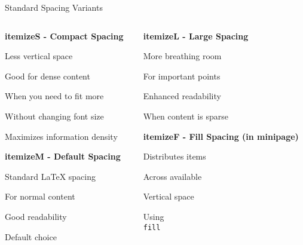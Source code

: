\documentclass[11pt,compress,t,notes=noshow, xcolor=table]{beamer}
\begin{document}
\begin{frame}{Standard Spacing Variants}
  \begin{columns}[T]
    \begin{column}{0.48\textwidth}
      \textbf{itemizeS - Compact Spacing}
      \begin{itemizeS}
        \item Less vertical space
        \item Good for dense content
        \item When you need to fit more
        \item Without changing font size
        \item Maximizes information density
      \end{itemizeS}
      
      \vspace{0.5cm}
      \textbf{itemizeM - Default Spacing}
      \begin{itemizeM}
        \item Standard LaTeX spacing
        \item For normal content
        \item Good readability
        \item Default choice
      \end{itemizeM}
    \end{column}
    
    \begin{column}{0.48\textwidth}
      \textbf{itemizeL - Large Spacing}
      \begin{itemizeL}
        \item More breathing room
        \item For important points
        \item Enhanced readability
        \item When content is sparse
      \end{itemizeL}
      
      \vspace{0.5cm}
      \textbf{itemizeF - Fill Spacing (in minipage)}
      \begin{minipage}[t]{\textwidth}
        \begin{itemizeF}
          \item Distributes items
          \item Across available
          \item Vertical space
          \item Using \texttt{\\fill}
        \end{itemizeF}
      \end{minipage}
    \end{column}
  \end{columns}
\end{frame}
\end{document}
